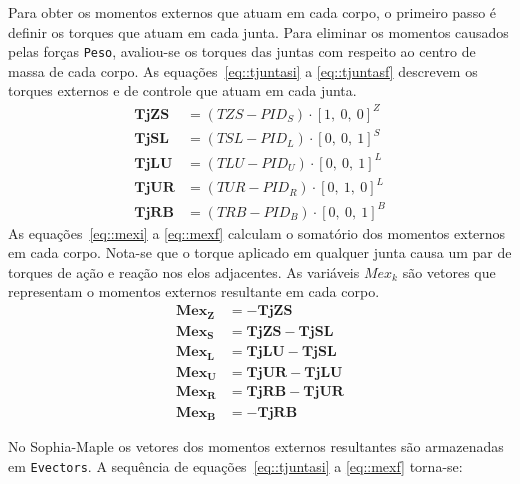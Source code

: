 Para obter os momentos externos que atuam em cada corpo, o primeiro passo é
definir os torques que atuam em cada junta. Para eliminar os momentos causados
pelas forças \texttt{Peso}, avaliou-se os torques das juntas com respeito ao
centro de massa de cada corpo. As equações~\ref{eq::tjuntasi} a
\ref{eq::tjuntasf} descrevem os torques externos e de controle que atuam em cada
junta.
\begin{align}
	\mathbf{TjZS} &= (TZS - PID_{S})\cdot[1,~0,~0]^Z \label{eq::tjuntasi} \\
	\mathbf{TjSL} &= (TSL - PID_{L})\cdot[0,~0,~1]^S \\
	\mathbf{TjLU} &= (TLU - PID_{U})\cdot[0,~0,~1]^L \\
	\mathbf{TjUR} &= (TUR - PID_{R})\cdot[0,~1,~0]^L \\
	\mathbf{TjRB} &= (TRB - PID_{B})\cdot[0,~0,~1]^B \label{eq::tjuntasf}
\end{align}
%
As equações~\ref{eq::mexi} a \ref{eq::mexf} calculam o somatório dos momentos
externos em cada corpo. Nota-se que o torque aplicado em qualquer junta causa
um par de torques de ação e reação nos elos adjacentes. As variáveis $Mex_k$ são
vetores que representam o momentos externos resultante em cada
corpo.
%
\begin{align}
	\mathbf{Mex_{Z}} &= - \mathbf{TjZS } \label{eq::mexi}\\
	\mathbf{Mex_{S}} &= \mathbf{TjZS} - \mathbf{TjSL }\\
	\mathbf{Mex_{L}} &= \mathbf{TjLU }- \mathbf{TjSL }\\
	\mathbf{Mex_{U}} &= \mathbf{TjUR }- \mathbf{TjLU }\\
	\mathbf{Mex_{R}} &= \mathbf{TjRB }- \mathbf{TjUR }\\
	\mathbf{Mex_{B}} &= - \mathbf{TjRB} \label{eq::mexf}
\end{align}
%


No Sophia-Maple os vetores dos momentos externos resultantes são armazenadas em
\texttt{Evectors}. A sequência de equações~\ref{eq::tjuntasi} a \ref{eq::mexf}
torna-se:

\bigskip {} \\
		  \\
		  \\
		  \\
		  \\

